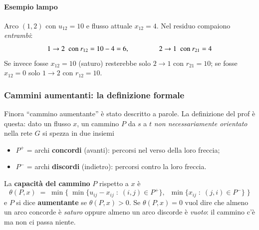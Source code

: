 \documentclass[12pt]{extarticle} %
\begin{document}
\paragraph{Esempio lampo}
Arco $(1,2)$ con $u_{12} = 10$ e flusso attuale $x_{12} = 4$. Nel residuo compaiono \emph{entrambi}:
\[
1 \to 2 \;\text{ con } r_{12} = 10 - 4 = 6, \hspace{1.5cm} 2 \to 1 \;\text{ con } r_{21} = 4
\]
Se invece fosse $x_{12} = 10$ (saturo) resterebbe solo $2\to1$ con $r_{21}=10$; se fosse $x_{12}=0$ solo $1\to2$ con $r_{12}=10$.

\subsubsection{Cammini aumentanti: la definizione formale}
Finora ``cammino aumentante'' è stato descritto a parole. La definizione del prof è questa: dato un flusso $x$, un cammino $P$ da $s$ a $t$ \emph{non necessariamente orientato} nella rete $G$ si spezza in due insiemi
\begin{itemize}
    \item $P^+$ = archi \textbf{concordi} (avanti): percorsi nel verso della loro freccia;
    \item $P^-$ = archi \textbf{discordi} (indietro): percorsi contro la loro freccia.
\end{itemize}
La \textbf{capacità del cammino} $P$ rispetto a $x$ è
\[
\theta(P,x) \;=\; \min\Big\{\; \min\{u_{ij}-x_{ij} \;:\; (i,j)\in P^+\},\;\; \min\{x_{ij} \;:\; (j,i)\in P^-\} \;\Big\}
\]
e $P$ si dice \textbf{aumentante} se $\theta(P,x) > 0$. Se $\theta(P,x)=0$ vuol dire che almeno un arco concorde è \emph{saturo} oppure almeno un arco discorde è \emph{vuoto}: il cammino c'è ma non ci passa niente.
\end{document}
